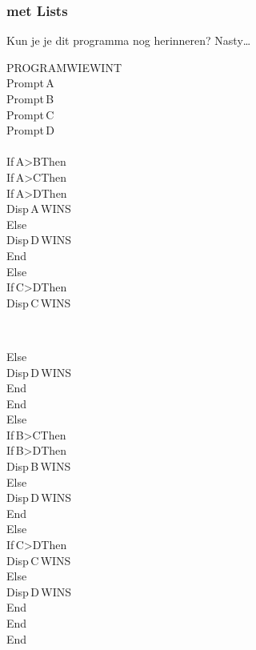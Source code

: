 \begin{frame}
\frametitle{ met Lists}

\begin{minipage}{0.48\textwidth}
Kun je je dit programma nog herinneren? Nasty\ldots

\vspace{0.2cm}
\begin{ticalc}
	PROGRAM\:WIEWINT\\%
	\:Prompt\,A\\%
	\:Prompt\,B\\%
	\:Prompt\,C\\%
	\:Prompt\,D\\%
	\:\\%
	\:If\,A>B\:Then\\%
		\:If\,A>C\:Then\\%
			\:If\,A>D\:Then\\%
				\:Disp\,\qt A\,WINS\qt\\%
			\:Else\\%
				\:Disp\,\qt D\,WINS\qt\\%
			\:End\\%
		\:Else\\%
			\:If\,C>D\:Then\\%
				\:Disp\,\qt C\,WINS\qt\\%
\end{ticalc}
\end{minipage}
~
\begin{minipage}{0.48\textwidth}
\begin{ticalc}	
			\:Else\\%
				\:Disp\,\qt D\,WINS\qt\\%
			\:End\\%
		\:End\\%
	\:Else\\%
		\:If\,B>C\:Then\\%
			\:If\,B>D\:Then\\%
				\:Disp\,\qt B\,WINS\qt\\%
			\:Else\\%
				\:Disp\,\qt D\,WINS\qt\\%
			\:End\\%
		\:Else\\%
			\:If\,C>D\:Then\\%
				\:Disp\,\qt C\,WINS\qt\\%
			\:Else\\%
				\:Disp\,\qt D\,WINS\qt\\%
			\:End\\%
		\:End\\%
	\:End
\end{ticalc}
\end{minipage}

\end{frame}





